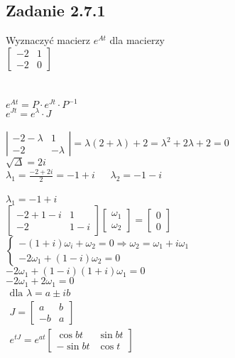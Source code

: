 \subsection*{Zadanie 2.7.1} {\color{darkgray}
	Wyznaczyć macierz $e^{At}$ dla macierzy\\
	$\left[\begin{array}{cc}-2&1\\-2&0\end{array}\right]$\\
}\lineh
\\\\
$e^{At}=P\cdot e^{Jt}\cdot P^{-1}$\\
$e^{Jt}=e^\lambda \cdot J$\\\\
$\left|\begin{array}{cc}-2-\lambda&1\\-2&-\lambda\end{array}\right|=\lambda(2+\lambda)+2=\lambda^2+2\lambda+2=0$\\
$\sqrt{\Delta}=2i$\\
$\lambda_1=\frac{-2+2i}{2}=-1+i \ \ \ \ \ \ \ \lambda_2=-1-i$\\
\\
$\boxed{ \lambda_1=-1+i}$\\
{\color{lightgray}
$\left[\begin{array}{cc}-2+1-i&1\\-2&1-i\end{array}\right]\left[\begin{array}{c}\omega_1\\ \omega_2\end{array}\right]=\left[\begin{array}{c}0\\0\end{array}\right]$\\
$\begin{cases}-(1+i)\omega_i+\omega_2=0 \Rightarrow \omega_2=\omega_1+i\omega_1 \\-2\omega_1+(1-i)\omega_2=0\end{cases}$\\
$-2\omega_1+(1-i)(1+i)\omega_1=0$\\
$-2\omega_1+2\omega_1=0$\\
}
$\boxed{\begin{aligned}
\text{dla }\lambda=a \pm ib\\
J=\left[\begin{array}{cc}a&b\\-b&a\end{array}\right]\\
e^{tJ}=e^{a t}\left[\begin{array}{cc}\cos bt&\sin bt\\-\sin bt& \cos t\end{array}\right]
\end{aligned}}$\\\\
